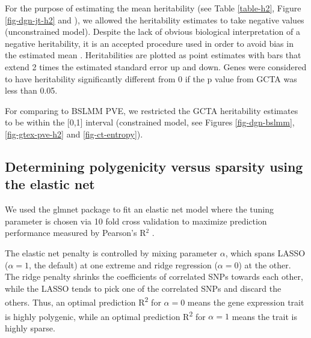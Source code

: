 \documentclass[10pt,letterpaper]{article}
\begin{document}
For the purpose of estimating the mean heritability (see Table \ref{table-h2}, Figure \ref{fig-dgn-jt-h2} and ), we allowed the heritability estimates to 
take negative values (unconstrained model). Despite the lack of obvious biological interpretation of a negative heritability, 
it is an accepted procedure used in order to avoid bias in the estimated mean \cite{Price_2011,Wright_2014}. Heritabilities are plotted as point estimates with bars that extend 2 times the estimated standard error up and down. Genes were considered to have heritability significantly different from 0 if the p value from GCTA was less than 0.05.

For comparing to BSLMM PVE, we restricted the GCTA heritability estimates to be within the [0,1] interval (constrained model, see Figures \ref{fig-dgn-bslmm}, \ref{fig-gtex-pve-h2} and \ref{fig-ct-entropy}). 

\subsection*{Determining polygenicity versus sparsity using the elastic
net}\label{determining-polygenicity-versus-sparsity-using-the-elastic-net}

We used the glmnet package to fit an elastic net model where the tuning parameter is chosen via 10 fold cross validation to maximize prediction performance measured by Pearson's R$^2$ \cite{Friedman_2010, Simon_2011}.


The elastic net penalty is controlled by mixing parameter \(\alpha\),
which spans LASSO (\(\alpha=1\), the default) \cite{Tibshirani_1996} at one extreme
and ridge regression (\(\alpha=0\)) \cite{Hoerl_1970} at the other. The ridge
penalty shrinks the coefficients of correlated SNPs towards each other,
while the LASSO tends to pick one of the correlated SNPs and discard the
others. Thus, an optimal prediction R\textsuperscript{2} for
\(\alpha=0\) means the gene expression trait is highly polygenic, while
an optimal prediction R\textsuperscript{2} for \(\alpha=1\) means the
trait is highly sparse. 
\end{document}
